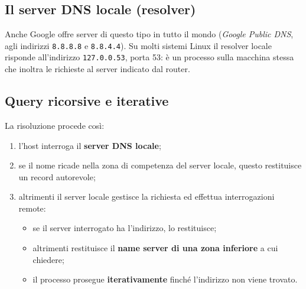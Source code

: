 \subsection{Il server DNS locale (resolver)}


Anche Google offre server di questo tipo in tutto il mondo (\emph{Google Public DNS}, agli indirizzi
\texttt{8.8.8.8} e \texttt{8.8.4.4}). Su molti sistemi Linux il resolver locale risponde all'indirizzo
\texttt{127.0.0.53}, porta 53: è un processo sulla macchina stessa che inoltra le richieste al server
indicato dal router.

\subsection{Query ricorsive e iterative}

La risoluzione procede così:

\begin{enumerate}
    \item l'host interroga il \textbf{server DNS locale};
    \item se il nome ricade nella zona di competenza del server locale, questo restituisce un record autorevole;
    \item altrimenti il server locale gestisce la richiesta ed effettua interrogazioni remote:
    \begin{itemize}
      \item se il server interrogato ha l'indirizzo, lo restituisce;
      \item altrimenti restituisce il \textbf{name server di una zona inferiore} a cui chiedere;
      \item il processo prosegue \textbf{iterativamente} finché l'indirizzo non viene trovato.
    \end{itemize}
\end{enumerate}


